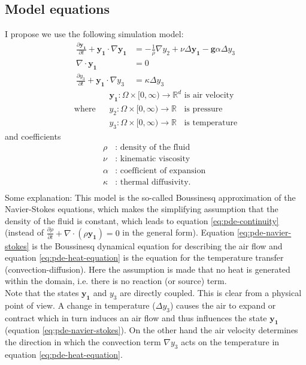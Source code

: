 \documentclass[
12pt,
a4paper,
onecolumn,
portrait
]{article}
\begin{document}
\subsection{Model equations}
I propose we use the following simulation model:
\begin{align}
\frac{\partial \mathbf{y_1}}{\partial t} + \mathbf{y_1} \cdot \nabla \mathbf{y_1} &= - \frac{1}{\rho} \nabla y_2 + \nu \Delta \mathbf{y_1} - \textbf{g} \alpha \Delta y_3 \label{eq:pde-navier-stokes}\\
\nabla \cdot \mathbf{y_1} &= 0 \label{eq:pde-continuity}\\
\frac{\partial y_3}{\partial t} + \mathbf{y_1} \cdot \nabla y_3 &= \kappa \Delta y_3 \label{eq:pde-heat-equation}
\end{align}
\begin{align*}
& \mathbf{y_1}: \Omega \times [0, \infty) \rightarrow \mathbb{R}^{d} \text{ is air velocity}  \\
\text{where}\;\;\; &y_2: \Omega \times [0, \infty) \rightarrow \mathbb{R} \;\; \text{ is pressure} \\
&y_3: \Omega \times [0, \infty) \rightarrow \mathbb{R} \;\; \text{ is temperature}
\end{align*}
and coefficients 
\begin{align*}
\rho &: \text{ density of the fluid } \\
\nu  &: \text{ kinematic viscosity } \\
\alpha &: \text{ coefficient of expansion } \\
\kappa &: \text{ thermal diffusivity. } \\
\end{align*}
Some explanation: This model is the so-called Boussinesq approximation of the Navier-Stokes equations, which makes the simplifying assumption that the density of the fluid is constant, which leads to equation \eqref{eq:pde-continuity} (instead of $\frac{\partial \rho}{\partial t} + \nabla \cdot (\rho \mathbf{y_1}) = 0$ in the general form). Equation \eqref{eq:pde-navier-stokes} is the Boussinesq dynamical equation for describing the air flow and equation \eqref{eq:pde-heat-equation} is the equation for the temperature transfer (convection-diffusion). Here the assumption is made that no heat is generated within the domain, i.e. there is no reaction (or source) term.\\
Note that the states $\mathbf{y_1}$ and $y_3$ are directly coupled. This is clear from a physical point of view. A change in temperature ($\Delta y_3$) causes the air to expand or contract which in turn induces an air flow and thus influences the state $\mathbf{y_1}$ (equation \eqref{eq:pde-navier-stokes}). On the other hand the air velocity determines the direction in which the convection term $\nabla y_3$ acts on the temperature in equation \eqref{eq:pde-heat-equation}.
\end{document}
